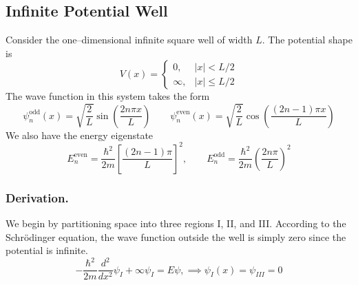 \documentclass[../../../main.tex]{subfiles}
\begin{document}
\subsection{Infinite Potential Well}
Consider the one--dimensional infinite square well of width \(L\).
The potential shape is
\begin{equation*}
    V(x)=
    \begin{cases}
        0,      & |x|<L/2      \\
        \infty, & |x| \leq L/2
    \end{cases}
\end{equation*}
The wave function in this system takes the form
\begin{equation*}
    \psi_n^{\text{odd}}(x) = \sqrt{\frac{2  }{L }} \sin\left(\frac{2 n \pi x}{L}\right)
    \qquad
    \psi_n^{\text{even}}(x) =\sqrt{\frac{2 }{L }} \cos\left(\frac{(2n-1)\pi x}{L}\right)
\end{equation*}
We also have the energy eigenstate
\begin{equation*}
    E_n^{\text{even}} = \frac{\hbar^2}{2 m} \left[\frac{(2n-1)\pi}{L}\right]^2, \qquad
    E_n^{\text{odd}} = \frac{\hbar^2}{2 m} \left(\frac{2 n \pi}{L}\right)^2
\end{equation*}

\subsubsection{Derivation.}
We begin by partitioning space into three regions I, II, and III.
According to the Schrödinger equation, the wave function outside the well is simply zero since the potential is infinite.
\begin{equation*}
    -\frac{\hbar^2 }{2m }\frac{d^2 }{dx^2 }\psi_I+\infty \psi_I=E\psi,\implies \psi_I(x)=\psi_{III}=0
\end{equation*}
\end{document}
